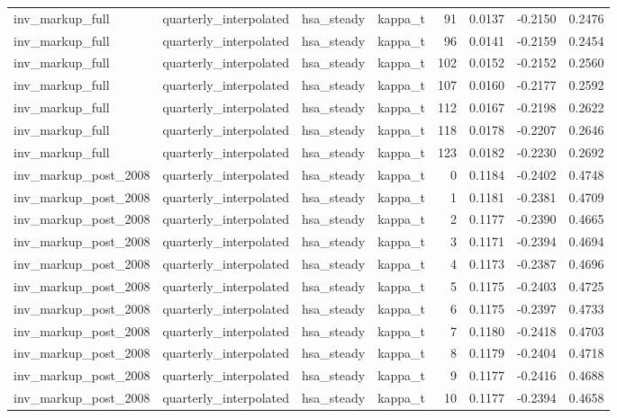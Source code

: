 \begin{tabular}{llllrrrr}
inv\_markup\_full & quarterly\_interpolated & hsa\_steady & kappa\_t & 91 & 0.0137 & -0.2150 & 0.2476 \\
inv\_markup\_full & quarterly\_interpolated & hsa\_steady & kappa\_t & 96 & 0.0141 & -0.2159 & 0.2454 \\
inv\_markup\_full & quarterly\_interpolated & hsa\_steady & kappa\_t & 102 & 0.0152 & -0.2152 & 0.2560 \\
inv\_markup\_full & quarterly\_interpolated & hsa\_steady & kappa\_t & 107 & 0.0160 & -0.2177 & 0.2592 \\
inv\_markup\_full & quarterly\_interpolated & hsa\_steady & kappa\_t & 112 & 0.0167 & -0.2198 & 0.2622 \\
inv\_markup\_full & quarterly\_interpolated & hsa\_steady & kappa\_t & 118 & 0.0178 & -0.2207 & 0.2646 \\
inv\_markup\_full & quarterly\_interpolated & hsa\_steady & kappa\_t & 123 & 0.0182 & -0.2230 & 0.2692 \\
inv\_markup\_post\_2008 & quarterly\_interpolated & hsa\_steady & kappa\_t & 0 & 0.1184 & -0.2402 & 0.4748 \\
inv\_markup\_post\_2008 & quarterly\_interpolated & hsa\_steady & kappa\_t & 1 & 0.1181 & -0.2381 & 0.4709 \\
inv\_markup\_post\_2008 & quarterly\_interpolated & hsa\_steady & kappa\_t & 2 & 0.1177 & -0.2390 & 0.4665 \\
inv\_markup\_post\_2008 & quarterly\_interpolated & hsa\_steady & kappa\_t & 3 & 0.1171 & -0.2394 & 0.4694 \\
inv\_markup\_post\_2008 & quarterly\_interpolated & hsa\_steady & kappa\_t & 4 & 0.1173 & -0.2387 & 0.4696 \\
inv\_markup\_post\_2008 & quarterly\_interpolated & hsa\_steady & kappa\_t & 5 & 0.1175 & -0.2403 & 0.4725 \\
inv\_markup\_post\_2008 & quarterly\_interpolated & hsa\_steady & kappa\_t & 6 & 0.1175 & -0.2397 & 0.4733 \\
inv\_markup\_post\_2008 & quarterly\_interpolated & hsa\_steady & kappa\_t & 7 & 0.1180 & -0.2418 & 0.4703 \\
inv\_markup\_post\_2008 & quarterly\_interpolated & hsa\_steady & kappa\_t & 8 & 0.1179 & -0.2404 & 0.4718 \\
inv\_markup\_post\_2008 & quarterly\_interpolated & hsa\_steady & kappa\_t & 9 & 0.1177 & -0.2416 & 0.4688 \\
inv\_markup\_post\_2008 & quarterly\_interpolated & hsa\_steady & kappa\_t & 10 & 0.1177 & -0.2394 & 0.4658 \\

\end{tabular}
